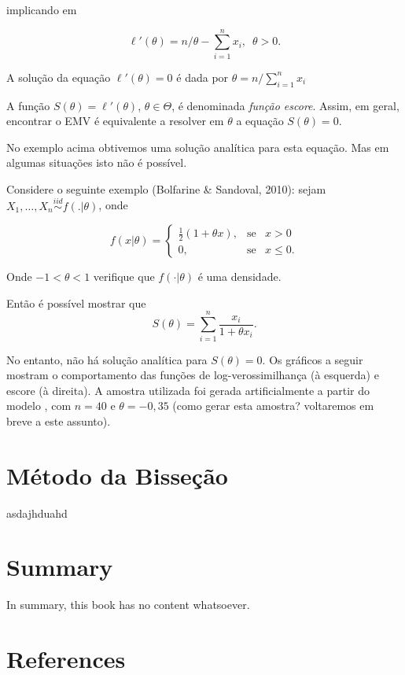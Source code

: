 \documentclass[
  letterpaper,
  DIV=11,
  numbers=noendperiod]{scrreprt}
\newlength{\cslhangindent}
\newenvironment{CSLReferences}[2] %
 {\begin{list}{}{%
  \setlength{\itemindent}{0pt}
  \setlength{\leftmargin}{0pt}
  \setlength{\parsep}{0pt}
  \ifodd #1
   \setlength{\leftmargin}{\cslhangindent}
   \setlength{\itemindent}{-1\cslhangindent}
  \fi
  \setlength{\itemsep}{#2\baselineskip}}}
 {\end{list}}
\begin{document}
implicando em

\[
\ell'(\theta)= n/\theta - \sum_{i=1}^n x_i, \,\,\, \theta > 0. 
\]

A solução da equação \(\ell'(\theta)=0\) é dada por
\(\widehat{\theta}= n/\sum_{i=1}^n x_i\)

A função \(S(\theta)=\ell'(\theta)\), \(\theta \in \Theta\), é
denominada \emph{função escore}. Assim, em geral, encontrar o EMV é
equivalente a resolver em \(\theta\) a equação \(S(\theta)=0\).

No exemplo acima obtivemos uma solução analítica para esta equação. Mas
em algumas situações isto não é possível.

Considere o seguinte exemplo (Bolfarine \& Sandoval, 2010): sejam
\(X_1, \ldots,X_n \overset{iid}{\sim} f(.|\theta)\), onde

\[
    f(x|\theta) = \left\{
    \begin{matrix}
        \frac{1}{2}(1+\theta x), &  \mbox{se} & x>0\\
          0, &  \mbox{se} & x\leq 0. 
    \end{matrix}
         \right.
\]

Onde \(-1 < \theta <1\) verifique que \(f(\cdot|\theta)\) é uma
densidade.

Então é possível mostrar que \[
S(\theta)= \sum_{i=1}^n \frac{x_i}{1+\theta x_i}. 
\]

No entanto, não há solução analítica para \(S(\theta)=0\). Os gráficos a
seguir mostram o comportamento das funções de log-verossimilhança (à
esquerda) e escore (à direita). A amostra utilizada foi gerada
artificialmente a partir do modelo , com \(n=40\) e \(\theta=-0,35\)
(como gerar esta amostra? voltaremos em breve a este assunto).

\chapter{Método da Bisseção}\label{muxe9todo-da-bisseuxe7uxe3o}

asdajhduahd


\chapter{Summary}\label{summary}

In summary, this book has no content whatsoever.


\chapter*{References}\label{references}


\label{refs}
\begin{CSLReferences}{0}{1}
\end{CSLReferences}
\end{document}
